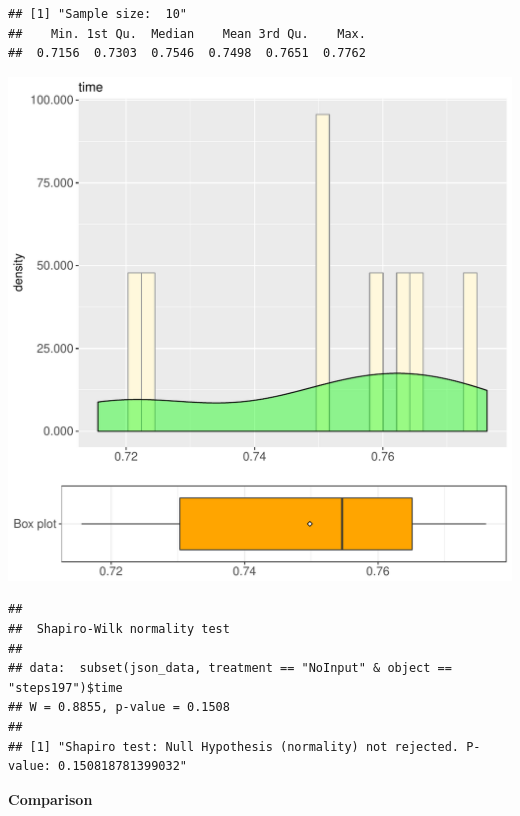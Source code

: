 \documentclass{article}\usepackage[]{graphicx}\usepackage[]{color}
\makeatletter
\def\maxwidth{ %
  \ifdim\Gin@nat@width>\linewidth
    \linewidth
  \else
    \Gin@nat@width
  \fi
}
\newenvironment{kframe}{%
 \def\at@end@of@kframe{}%
 \ifinner\ifhmode%
  \def\at@end@of@kframe{\end{minipage}}%
  \begin{minipage}{\columnwidth}%
 \fi\fi%
 \def\FrameCommand##1{\hskip\@totalleftmargin \hskip-\fboxsep
 \colorbox{shadecolor}{##1}\hskip-\fboxsep
     \hskip-\linewidth \hskip-\@totalleftmargin \hskip\columnwidth}%
 \MakeFramed {\advance\hsize-\width
   \@totalleftmargin\z@ \linewidth\hsize
   \@setminipage}}%
 {\par\unskip\endMakeFramed%
 \at@end@of@kframe}
\newenvironment{knitrout}{}{} %
\makeatother
\begin{document}
\begin{knitrout}
\color{fgcolor}\begin{kframe}
\begin{verbatim}
## [1] "Sample size:  10"
##    Min. 1st Qu.  Median    Mean 3rd Qu.    Max. 
##  0.7156  0.7303  0.7546  0.7498  0.7651  0.7762
\end{verbatim}
\end{kframe}
\includegraphics[width=\maxwidth]{figure/RH4_NoInput_steps197-1} 
\begin{kframe}\begin{verbatim}
## 
## 	Shapiro-Wilk normality test
## 
## data:  subset(json_data, treatment == "NoInput" & object == "steps197")$time
## W = 0.8855, p-value = 0.1508
## 
## [1] "Shapiro test: Null Hypothesis (normality) not rejected. P-value: 0.150818781399032"
\end{verbatim}
\end{kframe}
\end{knitrout}
  
 \textbf{Comparison}
  
\end{document}
